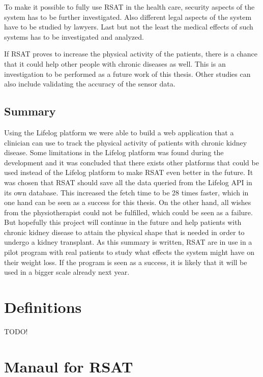 \documentclass{cslthse-msc}
\begin{document}
To make it possible to fully use RSAT in the health care, security aspects of the system has to be further investigated. Also different legal aspects of the system have to be studied by lawyers. Last but not the least the medical effects of such systems has to be investigated and analyzed. 

If RSAT proves to increase the physical activity of the patients, there is a chance that it could help other people with chronic diseases as well. This is an investigation to be performed as a future work of this thesis. Other studies can also include validating the accuracy of the sensor data.
   
\section{Summary}

Using the Lifelog platform we were able to build a web application that a clinician can use to track the physical activity of patients with chronic kidney disease. Some limitations in the Lifelog platform was found during the development and it was concluded that there exists other platforms that could be used instead of the Lifelog platform to make RSAT even better in the future.
It was chosen that RSAT should save all the data queried from the Lifelog API in its own database. This increased the fetch time to be 28 times faster, which in one hand can be seen as a success for this thesis. On the other hand, all wishes from the physiotherapist could not be fulfilled, which could be seen as a failure. But hopefully this project will continue in the future and help patients with chronic kidney disease to attain the physical shape that is needed in order to undergo a kidney transplant.
As this summary is written, RSAT are in use in a pilot program with real patients to study what effects the system might have on their weight loss. If the program is seen as a success, it is likely that it will be used in a bigger scale already next year. 


\begin{appendices}
\chapter{Definitions}
TODO!
\chapter{Manaul for RSAT}



\end{appendices}
\end{document}
